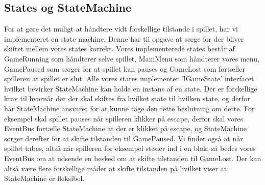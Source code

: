 \subsection{States og StateMachine}
For at gøre det muligt at håndtere vidt forskellige tilstande i spillet, har vi implementeret en state machine. Denne har til opgave at sørge for der bliver skiftet mellem vores states korrekt. Vores implementerede states består af GameRunning som håndterer selve spillet, MainMenu som håndterer vores menu, GamePaused som sørger for at spillet kan pauses og GameLost som fortæller spilleren at spillet er slut. Alle vores states implementer 'IGameState' interfacet hvilket bevirker StateMachine kan holde en instans af en state. Der er forskellige krav til hvornår der der skal skiftes fra hvilket state til hvilken state, og derfor har StateMachine ansvaret for at kunne tage den rette beslutning om dette. For eksempel skal spillet pauses når spilleren klikker på escape, derfor skal vores EventBus fortælle StateMachine at der er klikket på escape, og StateMachine sørger derefter for at skifte tilstanden til GamePaused. Vi finder også at når spillet tabes, altså når spilleren for eksempel støder ind i en blok, så bedes vores EventBus om at udsende en besked om at skifte tilstanden til GameLost. Der kan altså være flere forskellige måder at skifte tilstanden på hvilket viser at StateMachine er fleksibel.

